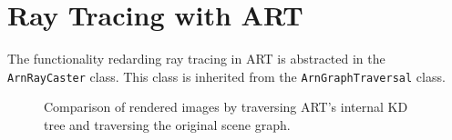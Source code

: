 \section{Ray Tracing with ART}
The functionality redarding ray tracing in ART is abstracted in the \texttt{ArnRayCaster} class. This class is inherited from the \texttt{ArnGraphTraversal} class. 



\begin{figure}[!tbp]
	\centering
	\hfill
	\caption{Comparison of rendered images by traversing ART's internal KD tree and traversing the original scene graph.}
	\label{fig:org_scenegraph}
\end{figure}

